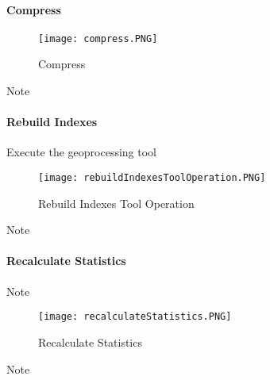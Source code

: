 \documentclass[class=article , crop=false, titlepage, twoside, multi={itemize, figure, verbatim}, float=false]{standalone}
\begin{document}
\paragraph{Compress}
\begin{figure}[h!]
\centering
	\texttt{[image: compress.PNG]}
\caption{Compress}
\end{figure}
Note
\clearpage
\paragraph{Rebuild Indexes}
Execute the geoprocessing tool
\begin{figure}[h!]
\centering
	\texttt{[image: rebuildIndexesToolOperation.PNG]}
\caption{Rebuild Indexes Tool Operation}
\end{figure}
Note
\clearpage

\paragraph{Recalculate Statistics}
Note
\begin{figure}[h!]
\centering
	\texttt{[image: recalculateStatistics.PNG]}
\caption{Recalculate Statistics}
\end{figure}
Note
\clearpage
\end{document}
